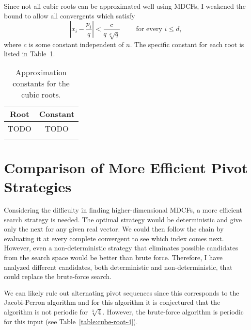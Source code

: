 Since not all cubic roots can be approximated well using MDCFs,
I weakened the bound to allow all convergents which satisfy
\[
  \left|x_i - \frac{p_i}{q}\right| < \frac{c}{q \, \sqrt[d]{q}} \qquad \text{ for every } i ≤ d,
\]
where $c$ is some constant independent of $n$.
The specific constant for each root is listed in Table~\ref{tbl:approx-const}.
\begin{table}[tbp]
  \centering
  \begin{tabular}{cc}
    \uzlhline
    Root & Constant \\
    \hline
    TODO & TODO \\
    \uzlhline
  \end{tabular}
  \caption{Approximation constants for the cubic roots.}
  \label{tbl:approx-const}
\end{table}




\section{Comparison of More Efficient Pivot Strategies}

Considering the difficulty in finding higher-dimensional MDCFs,
a more efficient search strategy is needed.
The optimal strategy would be deterministic
and give only the next for any given real vector.
We could then follow the chain by evaluating it at every complete convergent to
see which index comes next.
However, even a non-deterministic strategy that eliminates possible candidates
from the search space would be better than brute force.
Therefore, I have analyzed different candidates, both deterministic and
non-deterministic, that could replace the brute-force search.

We can likely rule out alternating pivot sequences since this corresponds to
the Jacobi-Perron algorithm and for this algorithm it is conjectured
\cite{Karpenkov21} that the algorithm is not periodic for $\sqrt[3]{4}$.
However, the brute-force algorithm is periodic for this input (see Table~\ref{table:cube-root-4}).
